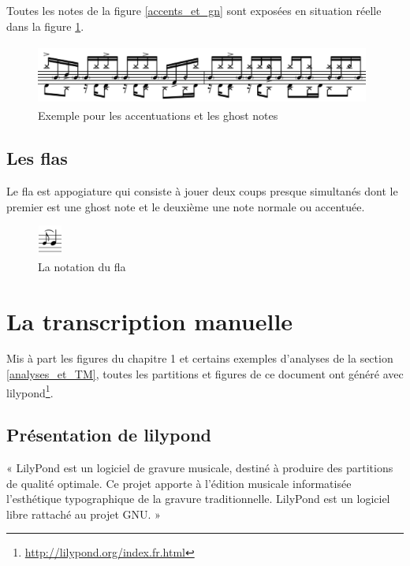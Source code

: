 Toutes les notes de la figure \ref{accents_et_gn} sont exposées en situation
réelle dans la figure \ref{exemple_acc_et_gn}. 
\begin{figure}[h]
\centering
\includegraphics[height=20mm, width=110mm]{
z_images/3_methodes/0_notation_de_la_batterie/8_accents_et_ghost-notes_1.png}
\caption{Exemple pour les accentuations et les ghost notes}
\label{exemple_acc_et_gn}
\end{figure}

\subsection*{Les flas}
Le fla est appogiature qui consiste à jouer deux coups presque simultanés dont
le premier est une ghost note et le deuxième une note normale ou accentuée.
\begin{figure}[h]
    \centering
    \includegraphics[height=10mm, width=8mm]{
    z_images/3_methodes/0_notation_de_la_batterie/fla_def.png}
    \caption{La notation du fla}
\end{figure}

\section{La transcription manuelle}
\label{tm}
Mis à part les figures du chapitre 1 et certains exemples d’analyses de la
section \ref{analyses_et_TM}, toutes les partitions et figures de ce document
ont généré avec lilypond\footnote{\url{http://lilypond.org/index.fr.html}}.\\

\subsection*{Présentation de lilypond}
« LilyPond est un logiciel de gravure musicale, destiné à produire des
partitions de qualité optimale. Ce projet apporte à l’édition musicale
informatisée l’esthétique typographique de la gravure traditionnelle. LilyPond
est un logiciel libre rattaché au projet GNU. »\\

